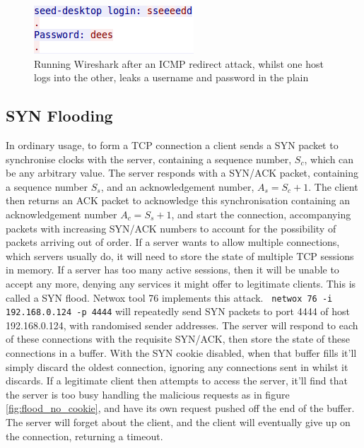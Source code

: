 \begin{figure}[h]
    \centering
    \includegraphics{images/telnet_sucks.png}
    \caption{Running Wireshark after an ICMP redirect attack, whilst one host logs into the other, leaks a username and
    password in the plain}
    \label{fig:telnet_sucks}
\end{figure}
\subsection{SYN Flooding}\label{sec_synflood}

In ordinary usage, to form a TCP connection a client sends a SYN packet to synchronise clocks with the server,
containing a sequence number, $S_c$, which can be any arbitrary value. The server responds with a SYN/ACK packet,
containing a sequence number $S_s$, and an acknowledgement number, $A_s = S_c+1$. The client then returns an ACK packet
to acknowledge this synchronisation containing an acknowledgement number $A_c = S_s+1$, and start the connection,
accompanying packets with increasing SYN/ACK numbers to account for the possibility of packets arriving out of order. If a
server wants to allow multiple connections, which servers usually do, it will need to store the state of multiple TCP
sessions in memory. If a server has too many active sessions, then it will be unable to accept any more, denying any
services it might offer to legitimate clients. This is called a SYN flood. Netwox tool 76 implements this attack. {\tt
netwox 76 -i 192.168.0.124 -p 4444} will repeatedly send SYN packets to port 4444 of host 192.168.0.124, with randomised
sender addresses. The server will respond to each of these connections with the requisite SYN/ACK, then store the state
of these connections in a buffer. With the SYN cookie disabled, when that buffer fills it'll simply discard the oldest
connection, ignoring any connections sent in whilst it discards. If a legitimate client then attempts to access the
server, it'll find that the server is too busy handling the malicious requests as in figure \ref{fig:flood_no_cookie},
and have its own request pushed off the end of the buffer. The server will forget about the client, and the client will
eventually give up on the connection, returning a timeout.

